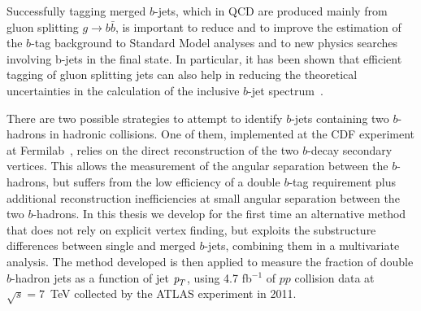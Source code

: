 Successfully tagging merged $b$-jets, which in QCD are produced mainly from gluon splitting $g \rightarrow b\bar{b}$, is important to reduce and to improve the estimation of the $b$-tag background to Standard Model analyses and to new physics searches involving b-jets in the final state.  In particular, it has been shown that efficient tagging of gluon splitting jets can also help in reducing the theoretical uncertainties in the calculation of the inclusive $b$-jet spectrum~\cite{Salam.AccurateHQ}.













There are two possible strategies to attempt to identify $b$-jets containing two $b$-hadrons in hadronic collisions. One of them, implemented at the CDF experiment at Fermilab~\cite{CDFAzimutalCorrelation}, relies on the direct reconstruction of the two $b$-decay secondary vertices. This %
allows the measurement of the angular separation between the $b$-hadrons, but suffers from the low efficiency of a double $b$-tag requirement plus additional reconstruction inefficiencies at small angular separation between the two $b$-hadrons. In this thesis we develop for the first time an alternative method that does not rely on explicit vertex finding, but exploits the substructure differences between single and merged $b$-jets, combining them in a multivariate analysis. 
The method developed is then applied to measure the fraction of double $b$-hadron jets as a function of jet ${\emph{p}_{T}}$, using 4.7 fb$^{-1}$ of $pp$ collision data at $\sqrt{s}=7$~TeV collected by the ATLAS experiment in 2011.

